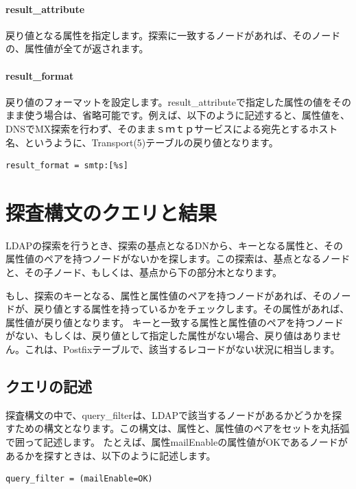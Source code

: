 \paragraph{result\_attribute}
戻り値となる属性を指定します。探索に一致するノードがあれば、そのノードの、属性値が全てが返されます。

\paragraph{result\_format}
戻り値のフォーマットを設定します。result\_attributeで指定した属性の値をそのまま使う場合は、省略可能です。例えば、以下のように記述すると、属性値を、DNSでMX探索を行わず、そのままｓｍｔｐサービスによる宛先とするホスト名、というように、Transport(5)テーブルの戻り値となります。

\begin{verbatim}
result_format = smtp:[%s]
\end{verbatim}

\section{探査構文のクエリと結果}



LDAPの探索を行うとき、探索の基点となるDNから、キーとなる属性と、その属性値のペアを持つノードがないかを探します。この探索は、基点となるノードと、その子ノード、もしくは、基点から下の部分木となります。

もし、探索のキーとなる、属性と属性値のペアを持つノードがあれば、そのノードが、戻り値とする属性を持っているかをチェックします。その属性があれば、属性値が戻り値となります。
キーと一致する属性と属性値のペアを持つノードがない、もしくは、戻り値として指定した属性がない場合、戻り値はありません。これは、Postfixテーブルで、該当するレコードがない状況に相当します。

\subsection{クエリの記述}

探査構文の中で、query\_filterは、LDAPで該当するノードがあるかどうかを探すための構文となります。この構文は、属性と、属性値のペアをセットを丸括弧で囲って記述します。
たとえば、属性mailEnableの属性値がOKであるノードがあるかを探すときは、以下のように記述します。

\begin{verbatim}
query_filter = (mailEnable=OK)
\end{verbatim}

